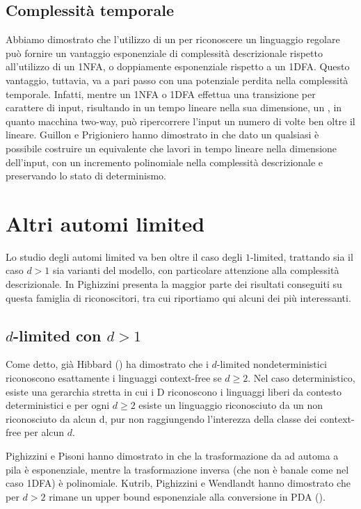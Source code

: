 \subsection{Complessità temporale}
Abbiamo dimostrato che l'utilizzo di un  per riconoscere un linguaggio regolare può fornire un vantaggio esponenziale di complessità descrizionale rispetto all'utilizzo di un 1NFA, o doppiamente esponenziale rispetto a un 1DFA. Questo vantaggio, tuttavia, va a pari passo con una potenziale perdita nella complessità temporale. Infatti, mentre un 1NFA o 1DFA effettua una transizione per carattere di input, risultando in un tempo lineare nella sua dimensione, un , in quanto macchina two-way, può ripercorrere l'input un numero di volte ben oltre il lineare. Guillon e Prigioniero hanno dimostrato in \cite{Guillon:19:linearlimited} che dato un qualsiasi  è possibile costruire un  equivalente che lavori in tempo lineare nella dimensione dell'input, con un incremento polinomiale nella complessità descrizionale e preservando lo stato di determinismo.



\section{Altri automi limited}
Lo studio degli automi limited va ben oltre il caso degli $1$-limited, trattando sia il caso $d>1$ sia varianti del modello, con particolare attenzione alla complessità descrizionale. In \cite{Pighizzini:19:limited} Pighizzini presenta la maggior parte dei risultati conseguiti su questa famiglia di riconoscitori, tra cui riportiamo qui alcuni dei più interessanti.


\subsection{\texorpdfstring{$d$-limited con $d>1$}{d-limited con d>1}}
Come detto, già Hibbard (\cite{Hibbard:67:CFdet}) ha dimostrato che i $d$-limited nondeterministici riconoscono esattamente i linguaggi context-free se $d\geq2$. Nel caso deterministico, esiste una gerarchia stretta in cui i D riconoscono i linguaggi liberi da contesto deterministici e per ogni $d\geq2$ esiste un linguaggio riconosciuto da un  non riconosciuto da alcun \la d, pur non raggiungendo l'interezza della classe dei context-free per alcun $d$.

Pighizzini e Pisoni hanno dimostrato in \cite{Pighizzini:14:limitedCF} che la trasformazione da  ad automa a pila è esponenziale, mentre la trasformazione inversa (che non è banale come nel caso 1DFA\tto{}) è polinomiale. Kutrib, Pighizzini e Wendlandt hanno dimostrato che per $d>2$ rimane un upper bound esponenziale alla conversione in PDA (\cite{Kutrib:18:complexlimited}).


